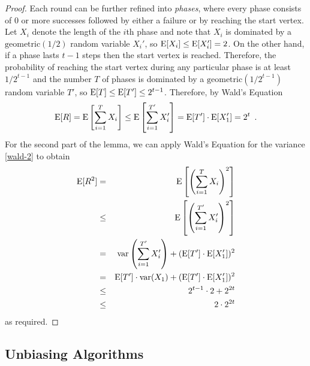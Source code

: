 \documentclass[acmtoalg]{acmtrans2m}
\DeclareMathOperator{\var}{var}
\begin{document}
\begin{proof}
Each round can be further refined into \emph{phases}, where every
phase consists of 0 or more successes followed by either a failure or
by reaching the start vertex.  Let $X_i$ denote the length of the
$i$th phase and note that $X_i$ is dominated by a
$\mathrm{geometric}(1/2)$ random variable $X_i'$, so
$\mathrm{E}[X_i]\le\mathrm{E}[X_i'] = 2$.  On the other hand, if a phase lasts $t-1$
steps then the start vertex is reached.  Therefore, the probability of
reaching the start vertex during any particular phase is at least
$1/2^{t-1}$ and the number $T$ of phases is dominated by a
$\mathrm{geometric}(1/2^{t-1})$ random variable $T'$, so
$\mathrm{E}[T]\le\mathrm{E}[T']\le 2^{t-1}$.  Therefore, by Wald's Equation
\[
  \mathrm{E}[R] = \mathrm{E}\left[\sum_{i=1}^T X_i\right]\le \mathrm{E}\left[\sum_{i=1}^{T'}
X_i'\right] = \mathrm{E}[T']\cdot\mathrm{E}[X_1'] = 2^t \enspace .
\]
For the second part of the lemma, we can apply Wald's Equation for
the variance \eqref{wald-2} to
obtain
\begin{eqnarray*}
  \E[R^2] & = & \E\left[\left(\sum_{i=1}^T X_i\right)^2\right] \\
          &\le& \E\left[\left(\sum_{i=1}^{T'} X_i'\right)^2\right] \\
          & = & \var\left(\sum_{i=1}^{T'} X_i'\right) + (\E[T']\cdot\E[X_1'])^2 \\
          & = & \E[T']\cdot\var(X_1) + (\E[T']\cdot\E[X_1'])^2 \\
          & \le & 2^{t-1}\cdot 2 + 2^{2t} \\
          & \le & 2\cdot2^{2t}
\comment{
          & = & \E\left[\sum_{i=1}^{T'} (X_i')^2
                + \sum_{i=1}^{T'}\sum_{j=i+1}^{T'} 2X_i'X_j' \right] \\
          & = & \E\left[\sum_{i=1}^{T'} (X_i')^2\right]
                + \E\left[\sum_{i=1}^{T'}\sum_{j=i+1}^{T'} 2X_i'X_j'\right] \\
          & = & \E[T']\cdot \E\left[(X_i')^2\right]
                + \E\left[\sum_{i=1}^T\sum_{j=i+1}^{T'} 2X_i'X_j'\right] \\
          & = & \E[T']\cdot \E\left[(X_i')^2\right]
                + \E\left[\sum_{i=1}^T\sum_{j=i+1}^{T'} 2X_i'X_j'\right] \\

}
\end{eqnarray*}
as required.
\end{proof}


\subsection{Unbiasing Algorithms}
\end{document}
